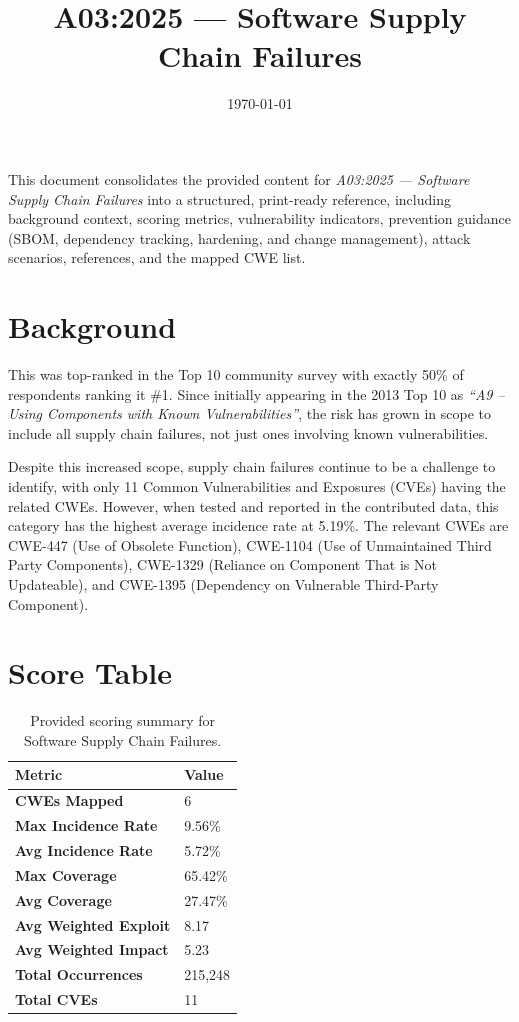 \documentclass[11pt]{article}
\title{\textbf{A03:2025 — Software Supply Chain Failures}}
\date{\today}
\author{} %
\begin{document}
\maketitle

\begin{infobox}
This document consolidates the provided content for \textit{A03:2025 — Software Supply Chain Failures} into a structured, print-ready reference, including background context, scoring metrics, vulnerability indicators, prevention guidance (SBOM, dependency tracking, hardening, and change management), attack scenarios, references, and the mapped CWE list.
\end{infobox}

\tableofcontents
\newpage

\section{Background}
This was top-ranked in the Top 10 community survey with exactly 50\% of respondents ranking it \#1. Since initially appearing in the 2013 Top 10 as \textit{``A9 – Using Components with Known Vulnerabilities''}, the risk has grown in scope to include all supply chain failures, not just ones involving known vulnerabilities.

Despite this increased scope, supply chain failures continue to be a challenge to identify, with only 11 Common Vulnerabilities and Exposures (CVEs) having the related CWEs. However, when tested and reported in the contributed data, this category has the highest average incidence rate at 5.19\%. The relevant CWEs are CWE-447 (Use of Obsolete Function), CWE-1104 (Use of Unmaintained Third Party Components), CWE-1329 (Reliance on Component That is Not Updateable), and CWE-1395 (Dependency on Vulnerable Third-Party Component).

\section{Score Table}
\begin{table}[h!]
\centering
\renewcommand{\arraystretch}{1.2}
\begin{tabular}{@{}>{\bfseries}p{4.9cm}p{3.1cm}@{}}
\toprule
Metric & Value \\
\midrule
CWEs Mapped & 6 \\
Max Incidence Rate & 9.56\% \\
Avg Incidence Rate & 5.72\% \\
Max Coverage & 65.42\% \\
Avg Coverage & 27.47\% \\
Avg Weighted Exploit & 8.17 \\
Avg Weighted Impact & 5.23 \\
Total Occurrences & 215{,}248 \\
Total CVEs & 11 \\
\bottomrule
\end{tabular}
\caption{Provided scoring summary for Software Supply Chain Failures.}
\end{table}
\end{document}
